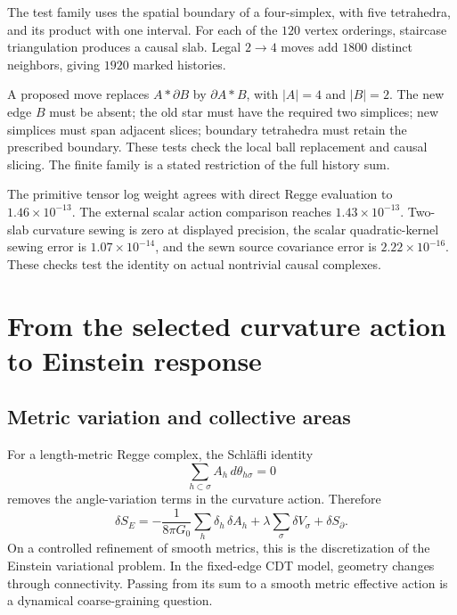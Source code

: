 The test family uses the spatial boundary of a four-simplex, with five tetrahedra, and its product with one interval. For each of the $120$ vertex orderings, staircase triangulation produces a causal slab. Legal $2\to4$ moves add $1800$ distinct neighbors, giving $1920$ marked histories.

A proposed move replaces $A*\partial B$ by $\partial A*B$, with $|A|=4$ and $|B|=2$. The new edge $B$ must be absent; the old star must have the required two simplices; new simplices must span adjacent slices; boundary tetrahedra must retain the prescribed boundary. These tests check the local ball replacement and causal slicing. The finite family is a stated restriction of the full history sum.

The primitive tensor log weight agrees with direct Regge evaluation to $1.46\times10^{-13}$. The external scalar action comparison reaches $1.43\times10^{-13}$. Two-slab curvature sewing is zero at displayed precision, the scalar quadratic-kernel sewing error is $1.07\times10^{-14}$, and the sewn source covariance error is $2.22\times10^{-16}$. These checks test the identity on actual nontrivial causal complexes.

\section{From the selected curvature action to Einstein response}
\label{sec:einstein}

\subsection{Metric variation and collective areas}

For a length-metric Regge complex, the Schläfli identity
\begin{equation}
\sum_{h\subset\sigma}A_h\,d\theta_{h\sigma}=0
\end{equation}
removes the angle-variation terms in the curvature action. Therefore
\begin{equation}
\delta S_E=-\frac1{8\pi G_0}\sum_h\delta_h\,\delta A_h
+\lambda\sum_\sigma\delta V_\sigma+\delta S_{\partial}.
\end{equation}
On a controlled refinement of smooth metrics, this is the discretization of the Einstein variational problem. In the fixed-edge CDT model, geometry changes through connectivity. Passing from its sum to a smooth metric effective action is a dynamical coarse-graining question.

